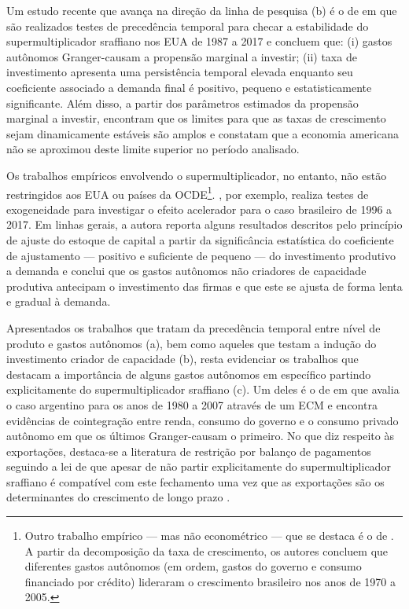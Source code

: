 Um estudo recente que avança na direção da linha de pesquisa (b) é o de \textcite{haluska_growth_2019} em que são realizados testes de precedência temporal para checar a estabilidade do supermultiplicador sraffiano nos EUA de 1987 a 2017 e concluem que: (i) gastos autônomos Granger-causam a propensão marginal a investir; (ii) taxa de investimento apresenta uma persistência temporal elevada enquanto seu coeficiente associado a demanda final é positivo, pequeno e estatisticamente significante. 
Além disso, a partir dos parâmetros estimados da propensão marginal a investir, encontram que os limites para que as taxas de crescimento sejam dinamicamente estáveis são amplos e constatam que a economia americana não se aproximou deste limite superior no período analisado.


Os trabalhos empíricos envolvendo o supermultiplicador, no entanto, não estão restringidos aos EUA ou países da OCDE\footnote{Outro trabalho empírico --- mas não econométrico --- que se destaca é o de \textcite{freitas_pattern_2013}.
	A partir da decomposição da taxa de crescimento, os autores concluem que diferentes gastos autônomos (em ordem, gastos do governo e consumo financiado por crédito) lideraram o crescimento brasileiro nos anos de 1970 a 2005.
}.  
\textcite{braga_investment_2018}, por exemplo, realiza testes de exogeneidade para investigar o efeito acelerador para o caso brasileiro de 1996 a 2017.
Em linhas gerais, a autora reporta alguns resultados descritos pelo princípio de ajuste do estoque de capital a partir da significância estatística do coeficiente de ajustamento --- positivo e suficiente de pequeno --- do investimento produtivo a demanda e conclui que os gastos autônomos não criadores de capacidade produtiva antecipam o investimento das firmas e que este se ajusta de forma lenta e gradual à demanda.

Apresentados os trabalhos que tratam da precedência temporal entre nível de produto e gastos autônomos (a), bem como aqueles que testam a indução do investimento criador de capacidade (b), resta evidenciar os trabalhos que destacam a importância de alguns gastos autônomos em específico partindo explicitamente do supermultiplicador sraffiano (c). 
Um deles é o de \textcite{medici_cointegration_2011} em que avalia o caso argentino para os anos de 1980 a 2007 através de um ECM e encontra evidências de cointegração entre renda, consumo do governo e o consumo privado autônomo em que os últimos Granger-causam o primeiro. 
No que diz respeito às exportações, destaca-se a literatura de restrição por balanço de pagamentos seguindo a lei de \textcite{mccombie_balance--payments_1994} que apesar de não partir explicitamente do supermultiplicador sraffiano é compatível com este fechamento uma vez que as exportações são os determinantes do crescimento de longo prazo \cite{bhering_thirlwall_2019}.


